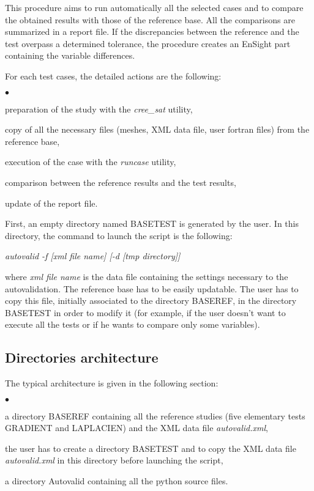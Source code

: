 This procedure aims to run automatically all the selected cases and to  
compare the obtained results with those of the reference base. All the 
comparisons are summarized in a report file.
If the discrepancies between the reference and the test overpass a 
determined tolerance, the procedure creates an EnSight part containing 
the variable differences.  

For each test cases, the detailed actions are the following:
\begin{list}{$\bullet$}{}
\item preparation of the study with the {\it cree\_sat} utility,
\item copy of all the necessary files (meshes, XML data file, user 
      fortran files) from the reference base,
\item execution of the case with the {\it runcase} utility,
\item comparison between the reference results and the test results,
\item update of the report file.
\end{list}

First, an empty directory named BASETEST is generated by the user. 
In this directory, the command to launch the script is the following:
\begin{center} 
{\it autovalid -f [xml file name] [-d [tmp directory]] }
\end{center}
where {\it xml file name} is the data file containing the settings 
necessary to the autovalidation. The reference base has to be easily 
updatable. The user has to copy this file, initially associated to the 
directory BASEREF, in the directory BASETEST in order to modify it (for 
example, if the user doesn't want to execute all the tests or if he
wants to compare only some variables).   

   
\subsection{Directories architecture} 

The typical architecture is given in the following section:

\begin{list}{$\bullet$}{}
\item a directory BASEREF containing all the reference studies 
      (five elementary tests GRADIENT and LAPLACIEN) and the XML data 
      file {\it autovalid.xml},
\item the user has to create a directory BASETEST and to copy
      the XML data file {\it autovalid.xml} in this directory before 
      launching the script,
\item a directory Autovalid containing all the python source files.
\end{list}




